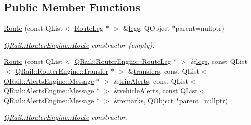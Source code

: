 \subsection*{Public Member Functions}
\begin{DoxyCompactItemize}
\item 
\mbox{\hyperlink{classQRail_1_1RouterEngine_1_1Route_a1a97cacc398b14f41b9c755b492b6b35}{Route}} (const Q\+List$<$ \mbox{\hyperlink{classQRail_1_1RouterEngine_1_1RouteLeg}{Route\+Leg}} $\ast$ $>$ \&\mbox{\hyperlink{classQRail_1_1RouterEngine_1_1Route_aeddeb0a07487274ecae67b4a9aef0701}{legs}}, Q\+Object $\ast$parent=nullptr)
\begin{DoxyCompactList}\small\item\em \mbox{\hyperlink{classQRail_1_1RouterEngine_1_1Route}{Q\+Rail\+::\+Router\+Engine\+::\+Route}} constructor (empty). \end{DoxyCompactList}\item 
\mbox{\hyperlink{classQRail_1_1RouterEngine_1_1Route_a5063644c4df5409194b773a140189005}{Route}} (const Q\+List$<$ \mbox{\hyperlink{classQRail_1_1RouterEngine_1_1RouteLeg}{Q\+Rail\+::\+Router\+Engine\+::\+Route\+Leg}} $\ast$ $>$ \&\mbox{\hyperlink{classQRail_1_1RouterEngine_1_1Route_aeddeb0a07487274ecae67b4a9aef0701}{legs}}, const Q\+List$<$ \mbox{\hyperlink{classQRail_1_1RouterEngine_1_1Transfer}{Q\+Rail\+::\+Router\+Engine\+::\+Transfer}} $\ast$ $>$ \&\mbox{\hyperlink{classQRail_1_1RouterEngine_1_1Route_a67674768d1b895227e8fe64d1b3f4e1f}{transfers}}, const Q\+List$<$ \mbox{\hyperlink{classQRail_1_1AlertsEngine_1_1Message}{Q\+Rail\+::\+Alerts\+Engine\+::\+Message}} $\ast$ $>$ \&\mbox{\hyperlink{classQRail_1_1RouterEngine_1_1Route_ae304c1e025a25cce45d6bbf51d0c8308}{trip\+Alerts}}, const Q\+List$<$ \mbox{\hyperlink{classQRail_1_1AlertsEngine_1_1Message}{Q\+Rail\+::\+Alerts\+Engine\+::\+Message}} $\ast$ $>$ \&\mbox{\hyperlink{classQRail_1_1RouterEngine_1_1Route_a8cc828d45bd8711e59197002f3881f90}{vehicle\+Alerts}}, const Q\+List$<$ \mbox{\hyperlink{classQRail_1_1AlertsEngine_1_1Message}{Q\+Rail\+::\+Alerts\+Engine\+::\+Message}} $\ast$ $>$ \&\mbox{\hyperlink{classQRail_1_1RouterEngine_1_1Route_acf7c65a4556fa8bdccff820dd8f8acfd}{remarks}}, Q\+Object $\ast$parent=nullptr)
\begin{DoxyCompactList}\small\item\em \mbox{\hyperlink{classQRail_1_1RouterEngine_1_1Route}{Q\+Rail\+::\+Router\+Engine\+::\+Route}} constructor. \end{DoxyCompactList}\item 

\end{DoxyCompactItemize}
